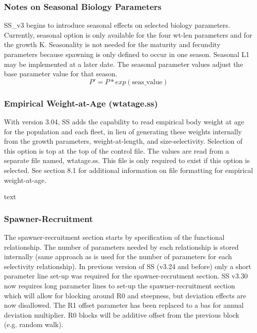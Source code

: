 \hypertarget{SeasGrowth}{}
\subsubsection{Notes on Seasonal Biology Parameters}
SS\_v3 begins to introduce seasonal effects on selected biology parameters.  Currently, seasonal option is only available for the four wt-len parameters and for the growth K.  Seasonality is not needed for the maturity and fecundity parameters because spawning is only defined to occur in one season.  Seasonal L1 may be implemented at a later date.  The seasonal parameter values adjust the base parameter value for that season.
\begin{equation}
P'=P*exp(\text{seas\_value})
\end{equation}

\hypertarget{WAAinfo}{}
\subsubsection{Empirical Weight-at-Age (wtatage.ss)}
With version 3.04, SS adds the capability to read empirical body weight at age for the population and each fleet, in lieu of generating these weights internally from the growth parameters, weight-at-length, and size-selectivity.  Selection of this option is top at the top of the control file.  The values are read from a separate file named, wtatage.ss.  This file is only required to exist if this option is selected.  See section 8.1 for additional information on file formatting for empirical weight-at-age.

\hypertarget{SRR}{text}
\subsubsection{Spawner-Recruitment}
The spawner-recruitment section starts by specification of the functional relationship.  The number of parameters needed by each relationship is stored internally (same approach as is used for the number of parameters for each selectivity relationship).  In previous version of SS (v3.24 and before) only a short parameter line set-up was required for the spawner-recrutment section. SS v3.30 now requires long parameter lines to set-up the spawner-recruitment section which will allow for blocking around R0 and steepness, but deviation effects are now disallowed.  The R1 offset parameter has been replaced to a bas for annual deviation multiplier.  R0 blocks will be additive offset from the previous block (e.g. random walk). 

